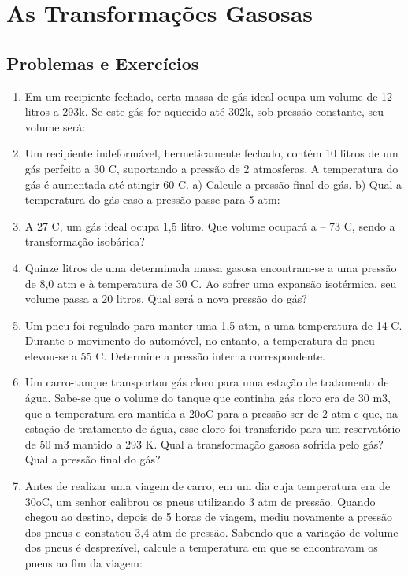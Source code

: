 \documentclass[12pt,a4paper]{book}
\begin{document}
	\newpage \section{As Transformações Gasosas}

		\newpage \subsection{Problemas e Exercícios}
		
\begin{enumerate}
\item Em um recipiente fechado, certa massa de gás ideal ocupa um volume de 12 litros a 293k. Se este gás for aquecido até 302k, sob pressão constante, seu volume será:
\item Um recipiente indeformável, hermeticamente fechado, contém 10 litros de um gás perfeito a 30 C, suportando a pressão de 2 atmosferas. A temperatura do gás é aumentada até atingir 60 C.
\newline a)	Calcule a pressão final do gás.
\newline b)	Qual a temperatura do gás caso a pressão passe para 5 atm:
\item A 27 C, um gás ideal ocupa 1,5 litro. Que volume ocupará a – 73 C, sendo a transformação isobárica?
\item Quinze litros de uma determinada massa gasosa encontram-se a uma pressão de 8,0 atm e à temperatura de 30 C. Ao sofrer uma expansão isotérmica, seu volume passa a 20 litros. Qual será a nova pressão do gás?
\item Um pneu foi regulado para manter uma 1,5 atm, a uma temperatura de 14 C. Durante o movimento do automóvel, no entanto, a temperatura do pneu elevou-se a 55 C. Determine a pressão interna correspondente.
\item Um carro-tanque transportou gás cloro para uma estação de tratamento de água. Sabe-se que o volume do tanque que continha gás cloro era de 30 m3, que a temperatura era mantida a 20oC para a pressão ser de 2 atm e que, na estação de tratamento de água, esse cloro foi transferido para um reservatório de 50 m3 mantido a 293 K. Qual a transformação gasosa sofrida pelo gás? Qual a pressão final do gás?
\item Antes de realizar uma viagem de carro, em um dia cuja temperatura era de 30oC, um senhor calibrou os pneus utilizando 3 atm de pressão. Quando chegou ao destino, depois de 5 horas de viagem, mediu novamente a pressão dos pneus e constatou 3,4 atm de pressão. Sabendo que a variação de volume dos pneus é desprezível, calcule a temperatura em que se encontravam os pneus ao fim da viagem:

\end{enumerate}
\end{document}
